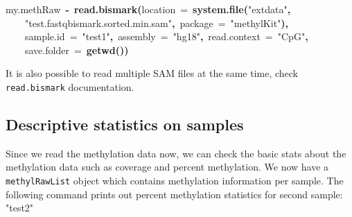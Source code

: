 \documentclass{article}
\makeatletter
\newcommand{\hlfunctioncall}[1]{\textcolor[rgb]{.5,0,.33}{\textbf{#1}}}%
\newcommand{\hlstring}[1]{\textcolor[rgb]{.6,.6,1}{#1}}%
\newcommand{\hlkeyword}[1]{\textbf{#1}}%
\newcommand{\hlargument}[1]{\textcolor[rgb]{.69,.25,.02}{#1}}%
\newcommand{\hlassignement}[1]{\textbf{#1}}%
\newcommand{\hlsymbol}[1]{#1}%
\newcommand{\hlstd}[1]{\textcolor[rgb]{0,0,0}{#1}}%
\newenvironment{kframe}{%
 \def\FrameCommand##1{\hskip\@totalleftmargin \hskip-\fboxsep
 \colorbox{shadecolor}{##1}\hskip-\fboxsep
     \hskip-\linewidth \hskip-\@totalleftmargin \hskip\columnwidth}%
 \MakeFramed {\advance\hsize-\width
   \@totalleftmargin\z@ \linewidth\hsize
   \@setminipage}}%
 {\par\unskip\endMakeFramed}
\newenvironment{knitrout}{}{} %
\makeatother
\begin{document}
\begin{knitrout}
\color{fgcolor}\begin{kframe}
\begin{flushleft}
\ttfamily\noindent
\hlsymbol{my.methRaw}{\ }\hlassignement{\usebox{\hlnormalsizeboxlessthan}-}{\ }\hlfunctioncall{read.bismark}\hlkeyword{(}\hlargument{location}{\ }\hlargument{=}{\ }\hlfunctioncall{system.file}\hlkeyword{(}\hlstring{"{}extdata"{}}\hlkeyword{,}\hspace*{\fill}\\
\hlstd{}{\ }{\ }{\ }{\ }\hlstring{"{}test.fastq\usebox{\hlnormalsizeboxunderscore}bismark.sorted.min.sam"{}}\hlkeyword{,}{\ }\hlargument{package}{\ }\hlargument{=}{\ }\hlstring{"{}methylKit"{}}\hlkeyword{)}\hlkeyword{,}\hspace*{\fill}\\
\hlstd{}{\ }{\ }{\ }{\ }\hlargument{sample.id}{\ }\hlargument{=}{\ }\hlstring{"{}test1"{}}\hlkeyword{,}{\ }\hlargument{assembly}{\ }\hlargument{=}{\ }\hlstring{"{}hg18"{}}\hlkeyword{,}{\ }\hlargument{read.context}{\ }\hlargument{=}{\ }\hlstring{"{}CpG"{}}\hlkeyword{,}\hspace*{\fill}\\
\hlstd{}{\ }{\ }{\ }{\ }\hlargument{save.folder}{\ }\hlargument{=}{\ }\hlfunctioncall{getwd}\hlkeyword{(}\hlkeyword{)}\hlkeyword{)}\mbox{}
\normalfont
\end{flushleft}
\end{kframe}
\end{knitrout}


It is also possible to read multiple SAM files at the same time, check \texttt{read.bismark} documentation.


\subsection{Descriptive statistics on samples}
Since we read the methylation data now, we can check the basic stats about the methylation data such as coverage and percent  methylation. We now have a \texttt{methylRawList} object which contains methylation information per sample. The following command prints out percent methylation statistics for second sample: "test2"
\end{document}
